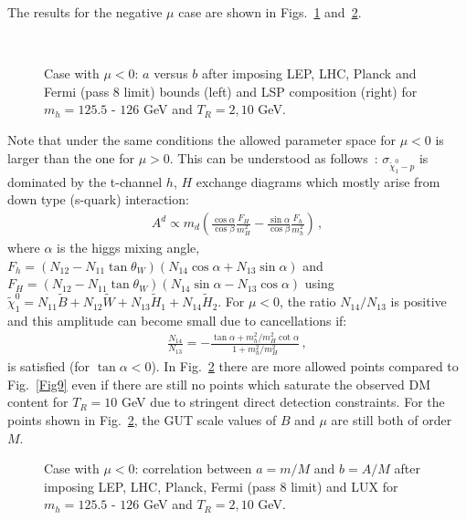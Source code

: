\documentclass[12pt,a4paper]{book}
\begin{document}
\begin{itemize}
The results for the negative $\mu$ case are shown in Figs.~\ref{Fig10} and~\ref{Fig11}.

\begin{figure}
\centering
{} \quad
{} \\
 \quad
{}
\caption{Case with $\mu<0$: $a$ versus $b$ after imposing LEP, LHC, Planck and Fermi (pass 8 limit) bounds (left) and LSP composition (right) for $m_h = 125.5$ - $126$ GeV and $T_R = 2, 10$ GeV.}
\label{Fig10}
\end{figure}

Note that under the same conditions the allowed parameter space for $\mu<0$ is larger than the one for $\mu>0$. This can be understood as follows~\cite{Arnowitt:2001yh, Ellis:2000jd}: $\sigma_{\tilde\chi^0_1-p}$ is dominated by the t-channel $h$, $H$ exchange diagrams which mostly arise from down type (s-quark) interaction:
\begin{align}
A^d\propto m_d\left({\frac{\cos\alpha}{\cos\beta}}{\frac{F_H}{m_H^2}}-{\frac{\sin\alpha}{\cos\beta}}{\frac{F_h}{m_h^2}}\right)\,,
\end{align}
where $\alpha$ is the higgs mixing angle, $F_h=(N_{12}-N_{11}\tan\theta_W)(N_{14}\cos\alpha+N_{13}\sin\alpha)$ and $F_H=(N_{12}-N_{11}\tan\theta_W)(N_{14}\sin\alpha-N_{13}\cos\alpha)$ using $\tilde\chi^0_1=N_{11}\tilde B+N_{12}\tilde W+N_{13}\tilde H_1+N_{14}\tilde H_2$. For $\mu<0$, the ratio $N_{14}/N_{13}$ is positive and this amplitude can become small due to cancellations if:
\begin{align}
\frac{N_{14}}{N_{13}}=- {\frac{\tan\alpha+m_h^2/m_H^2 \cot\alpha}{1+m_h^2/m_H^2}}\,,
\end{align}
is satisfied (for $\tan\alpha<0$). In Fig.~\ref{Fig11} there are more allowed points compared to Fig.~\ref{Fig9} even if there are still no points which saturate the observed DM content for $T_R=10$ GeV due to stringent direct detection constraints. For the points shown in Fig.~\ref{Fig11}, the GUT scale values of $B$ and $\mu$ are still both of order $M$.

\begin{figure}
\centering
{} \quad
{} 
\caption{Case with $\mu<0$: correlation between $a=m/M$ and $b=A/M$ after imposing LEP, LHC, Planck, Fermi (pass 8 limit)
and LUX for $m_h = 125.5$ - $126$ GeV and $T_R = 2, 10$ GeV.}
\label{Fig11}
\end{figure}
\end{itemize}
\end{document}
